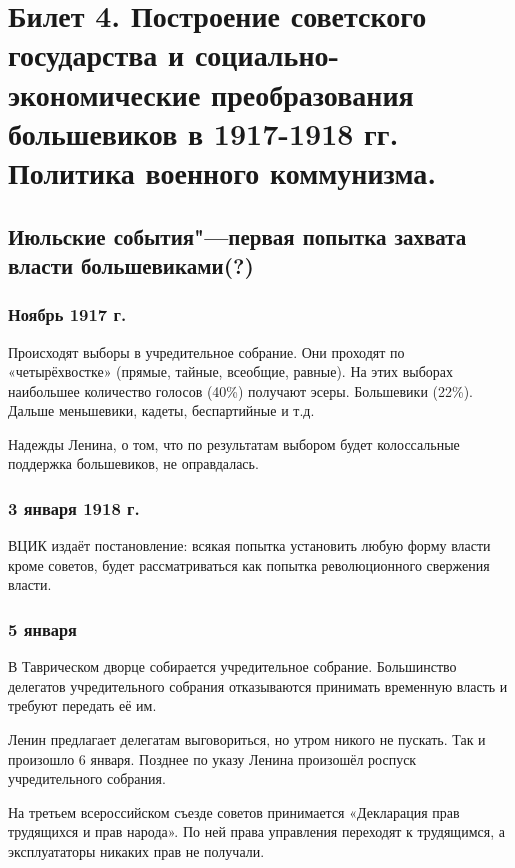 \section{Билет 4. Построение советского государства и социально-экономические преобразования большевиков в 1917-1918 гг. Политика военного коммунизма.}

\subsection{Июльские события"---первая попытка захвата власти большевиками(?)}

\subsubsection{\textbf{Ноябрь 1917 г.}}

 Происходят выборы в учредительное собрание. Они проходят по «четырёхвостке» (прямые, тайные, всеобщие, равные). На этих выборах наибольшее количество голосов (40\%) получают эсеры. Большевики (22\%). Дальше меньшевики, кадеты, беспартийные и т.д.
 
Надежды Ленина, о том, что по результатам выбором будет колоссальные поддержка большевиков, не оправдалась.

\subsubsection{\textbf{3 января 1918 г.}}

ВЦИК издаёт постановление: всякая попытка установить любую форму власти кроме советов, будет рассматриваться как попытка революционного свержения власти.

\subsubsection{\textbf{5 января}}

В Таврическом дворце собирается учредительное собрание. Большинство делегатов учредительного собрания отказываются принимать временную власть и требуют передать её им.

Ленин предлагает делегатам выговориться, но утром никого не пускать. Так и произошло 6 января. Позднее по указу Ленина произошёл роспуск учредительного собрания.

На третьем всероссийском съезде советов принимается «Декларация прав трудящихся и прав народа». По ней права управления переходят к трудящимся, а эксплуататоры никаких прав не получали.


